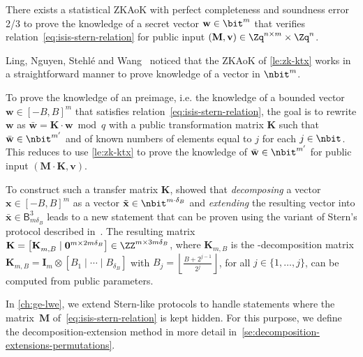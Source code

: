 \begin{lemma} \label{le:zk-ktx}
  There exists a statistical \textsf{ZKAoK} with perfect completeness and soundness error 2/3 to prove the knowledge of a secret vector $\mathbf{w} \in \bit^m$ that verifies relation~\eqref{eq:isis-stern-relation} for public input $(\mathbf{M}, \mathbf{v}) \in \Zq^{n \times m} \times \Zq^{n}$.
\end{lemma}

Ling, Nguyen, Stehlé and Wang~\cite{LNSW13} noticed that the \textsf{ZKAoK} of \cref{le:zk-ktx} works in a straightforward manner to prove knowledge of a vector in $\nbit^m$.


To prove the knowledge of an \ISIS preimage, i.e.
the knowledge of a bounded vector $\mathbf{w} \in [-B,B]^m$ that satisfies relation~\eqref{eq:isis-stern-relation}, the goal is to rewrite $\mathbf{w}$ as $\bar{\mathbf{w}} = \mathbf{K} \cdot \mathbf{w} \bmod q$ with a public transformation matrix $\mathbf{K}$ such that $\bar{\mathbf{w}} \in \nbit^{m'}$ and of known numbers of elements equal to $j$ for each $j \in \nbit$.
This reduces to use \cref{le:zk-ktx} to prove the knowledge of $\bar{\mathbf{w}} \in \nbit^{m'}$ for public input $(\mathbf{M} \cdot \mathbf{K}, \mathbf{v})$.

To construct such a transfer matrix $\mathbf{K}$,  \cite{LNSW13} showed that \textit{decomposing} a vector $\mathbf{x} \in [-B,B]^m$ as a vector $\tilde{\mathbf{x}} \in \nbit^{m \cdot \delta_B}$ and \textit{extending} the resulting vector into $\bar{\mathbf{x}} \in \mathsf{B}^3_{m \delta_B}$ leads to a new statement that can be proven using the variant of Stern's protocol described in~\cite{KTX08}.
The resulting matrix $\mathbf{K}= \left[\mathbf{K}_{m,B}^{} \mid \mathbf{0}^{m \times 2m\delta_B}\right] \in \ZZ^{m \times 3m\delta_B}$, where $\mathbf{K}_{m,B}^{}$ is the \nbit-decomposition matrix $\mathbf{K}_{m,B} = \mathbf{I}_m \otimes \left[B_1 \mid \cdots \mid B_{\delta_B} \right]$ with $B_j^{} = \left\lfloor \frac{B + 2^{j-1}}{2^j} \right\rfloor$, for all $j \in \{1,\ldots,j\}$, can be computed from public parameters.

In \cref{ch:ge-lwe}, we extend Stern-like protocols to handle statements where the matrix~$\mathbf M$ of~\eqref{eq:isis-stern-relation} is kept hidden. For this purpose, we define the decomposition-extension method in more detail in~\cref{se:decomposition-extensions-permutations}.


